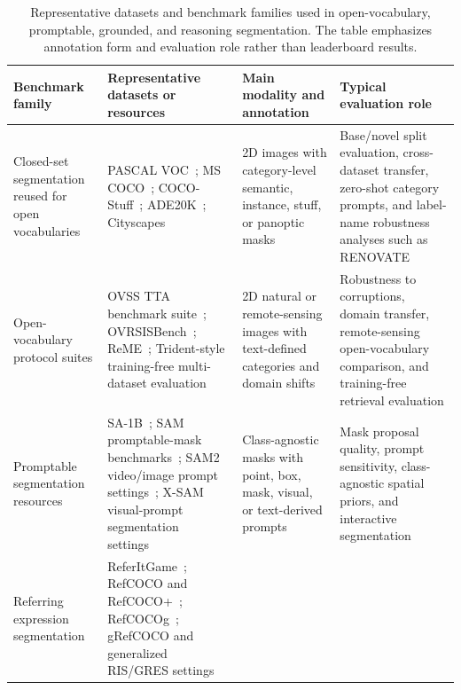 \begin{table}[t]
\centering
\small
\setlength{\tabcolsep}{5pt}
\renewcommand{\arraystretch}{1.34}
\caption{Representative datasets and benchmark families used in open-vocabulary, promptable, grounded, and reasoning segmentation. The table emphasizes annotation form and evaluation role rather than leaderboard results.}
\label{tab:dataset-index}
\begin{tabularx}{\textwidth}{>{\raggedright\arraybackslash}p{}>{\raggedright\arraybackslash}X>{\raggedright\arraybackslash}p{}>{\raggedright\arraybackslash}p{}}
\toprule
Benchmark family & Representative datasets or resources & Main modality and annotation & Typical evaluation role \\
\midrule
Closed-set segmentation reused for open vocabularies &
PASCAL VOC~\citep{everingham2015pascal};
MS COCO~\citep{lin2014microsoft};
COCO-Stuff~\citep{caesar2018cocostuff};
ADE20K~\citep{zhou2017scene};
Cityscapes~\citep{cordts2016cityscapes} &
2D images with category-level semantic, instance, stuff, or panoptic masks &
Base/novel split evaluation, cross-dataset transfer, zero-shot category prompts, and label-name robustness analyses such as RENOVATE~\citep{hhuangRenovatingNamesOpenvocabulary2024} \\
Open-vocabulary protocol suites &
OVSS TTA benchmark suite~\citep{noorimTesttimeAdaptationVisionlanguage2026};
OVRSISBench~\citep{libExploringEfficientOpenvocabulary2026};
ReME~\citep{xxuanReMEDataCentricFramework2025};
Trident-style training-free multi-dataset evaluation~\citep{shiyHarnessingVisionFoundation2025} &
2D natural or remote-sensing images with text-defined categories and domain shifts &
Robustness to corruptions, domain transfer, remote-sensing open-vocabulary comparison, and training-free retrieval evaluation \\
Promptable segmentation resources &
SA-1B~\citep{kirillov2023sam};
SAM promptable-mask benchmarks~\citep{kirillov2023sam};
SAM2 video/image prompt settings~\citep{ravi2024sam2};
X-SAM visual-prompt segmentation settings~\citep{hwangXSAMSegmentAnything2026} &
Class-agnostic masks with point, box, mask, visual, or text-derived prompts &
Mask proposal quality, prompt sensitivity, class-agnostic spatial priors, and interactive segmentation \\
Referring expression segmentation &
ReferItGame~\citep{kazemzadeh2014referitgame};
RefCOCO and RefCOCO+~\citep{yu2016modeling};
RefCOCOg~\citep{mao2016generation};
gRefCOCO and generalized RIS/GRES settings~\citep{xiaGsvaGeneralizedSegmentation2024} &

\end{tabularx}
\end{table}
